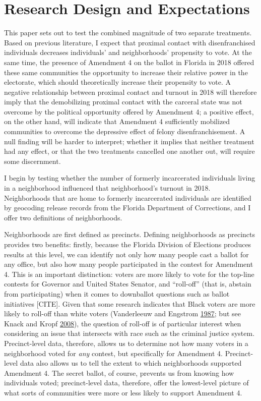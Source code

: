 \documentclass[
  12pt,
]{article}
\begin{document}
\hypertarget{research-design-and-expectations}{%
\section*{Research Design and Expectations}\label{research-design-and-expectations}}

This paper sets out to test the combined magnitude of two separate treatments. Based on previous literature, I expect that proximal contact with disenfranchised individuals decreases individuals' and neighborhoods' propensity to vote. At the same time, the presence of Amendment 4 on the ballot in Florida in 2018 offered these same communities the opportunity to increase their relative power in the electorate, which should theoretically increase their propensity to vote. A negative relationship between proximal contact and turnout in 2018 will therefore imply that the demobilizing proximal contact with the carceral state was not overcome by the political opportunity offered by Amendment 4; a positive effect, on the other hand, will indicate that Amendment 4 sufficiently mobilized communities to overcome the depressive effect of felony disenfranchisement. A null finding will be harder to interpret; whether it implies that neither treatment had any effect, or that the two treatments cancelled one another out, will require some discernment.

I begin by testing whether the number of formerly incarcerated individuals living in a neighborhood influenced that neighborhood's turnout in 2018. Neighborhoods that are home to formerly incarcerated individuals are identified by geocoding release records from the Florida Department of Corrections, and I offer two definitions of neighborhoods.

Neighborhoods are first defined as precincts. Defining neighborhoods as precincts provides two benefits: firstly, because the Florida Division of Elections produces results at this level, we can identify not only how many people cast a ballot for any office, but also how many people participated in the contest for Amendment 4. This is an important distinction: voters are more likely to vote for the top-line contests for Governor and United States Senator, and ``roll-off'' (that is, abstain from participating) when it comes to downballot questions such as ballot initiatives {[}CITE{]}. Given that some research indicates that Black voters are more likely to roll-off than white voters (Vanderleeuw and Engstrom \protect\hyperlink{ref-Vanderleeuw1987}{1987}; but see Knack and Kropf \protect\hyperlink{ref-Knack2008}{2008}), the question of roll-off is of particular interest when considering an issue that intersects with race such as the criminal justice system. Precinct-level data, therefore, allows us to determine not how many voters in a neighborhood voted for \emph{any} contest, but specifically for Amendment 4. Precinct-level data also allows us to tell the extent to which neighborhoods supported Amendment 4. The secret ballot, of course, prevents us from knowing how individuals voted; precinct-level data, therefore, offer the lowest-level picture of what sorts of communities were more or less likely to support Amendment 4.
\end{document}
